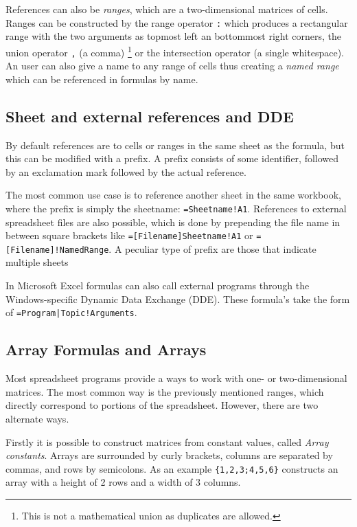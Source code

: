 \documentclass[conference]{IEEEtran}
\begin{document}
References can also be \emph{ranges}, which are a two-dimensional matrices of cells.
Ranges can be constructed by the range operator \texttt{:} which produces a rectangular range with the two arguments as topmost left an bottommost right corners, the union operator \texttt{,} (a comma) \footnote{This is not a mathematical union as duplicates are allowed.} or the intersection operator \texttt{} (a single whitespace). 
An user can also give a name to any range of cells thus creating a \emph{named range} which can be referenced in formulas by name.

\subsection{Sheet and external references and DDE}

By default references are to cells or ranges in the same sheet as the formula, but this can be modified with a prefix. A prefix consists of some identifier, followed by an exclamation mark followed by the actual reference.

The most common use case is to reference another sheet in the same workbook, where the prefix is simply the sheetname: \texttt{=Sheetname!A1}. References to external spreadsheet files are also possible, which is done by prepending the file name in between square brackets like \texttt{=[Filename]Sheetname!A1} or \texttt{=[Filename]!NamedRange}. A peculiar type of prefix are those that indicate multiple sheets

In Microsoft Excel formulas can also call external programs through the Windows-specific Dynamic Data Exchange (DDE).
These formula's take the form of \texttt{=Program|Topic!Arguments}.

\subsection{Array Formulas and Arrays}

Most spreadsheet programs provide a ways to work with one- or two-dimensional matrices.
The most common way is the previously mentioned ranges, which directly correspond to portions of the spreadsheet.
However, there are two alternate ways.

Firstly it is possible to construct matrices from constant values, called \emph{Array constants}.
Arrays are surrounded by curly brackets, columns are separated by commas, and rows by semicolons.
As an example \texttt{\{1,2,3;4,5,6\}} constructs an array with a height of 2 rows and a width of 3 columns.
\end{document}
